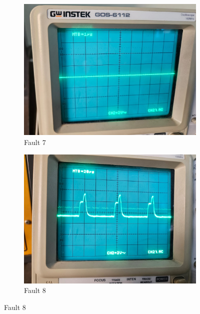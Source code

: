 \documentclass[a4paper,12pt]{article}
\begin{document}
\begin{figure}[H]
	\begin{subfigure}[t]{0.44\textwidth}
		\centering
		\includegraphics[width=1\linewidth]{Images/1.7}
		\caption{Fault 7}
		\vspace{0.1cm}
	\end{subfigure}
	\hfil
	\begin{subfigure}[t]{0.44\textwidth}
		\centering
		\includegraphics[width=1\linewidth]{Images/1.8}
		\caption{Fault 8}
		\vspace{0.1cm}
	\end{subfigure}
\end{figure}
\end{document}
